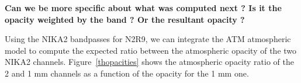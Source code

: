 {\bf Can we be more specific about what was computed next ? Is it the
  opacity weighted by the band ? Or the resultant opacity ?}

Using the NIKA2 bandpasses for N2R9, we can integrate the ATM
atmospheric model to compute the expected ratio between the
atmospheric opacity of the two NIKA2 channels. 
Figure~\ref{thopacities} shows the atmospheric opacity
ratio of the 2 and 1 mm channels as a function of the opacity for the
1 mm one.


